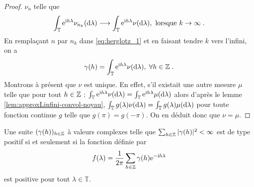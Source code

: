 \begin{proof}
$\nu_n$ telle que
$$
\int_{\mathbb{T}}\mathrm{e}^{\mathrm{i} h\lambda}\nu_{n_k}(\mathrm{d}\lambda)
\longrightarrow \int_{\mathbb{T}}\mathrm{e}^{\mathrm{i} h\lambda}\nu(\mathrm{d}\lambda),
\textrm{ lorsque }k\to\infty\;.
$$
En rempla\c{c}ant $n$ par $n_k$ dans \eqref{eq:herglotz_1} et en faisant
tendre $k$ vers l'infini, on a
$$
\gamma(h)=\int_{\mathbb{T}}\mathrm{e}^{\mathrm{i} h \lambda}\nu(\mathrm{d}\lambda),\; \forall h\in\mathbb{Z}\;.
$$
Montrons \`a pr\'esent que $\nu$ est unique. En effet, s'il existait une autre mesure
$\mu$ telle que pour tout $h\in\mathbb{Z}$ : $\int_{\mathbb{T}}\mathrm{e}^{\mathrm{i} h
  \lambda}\nu(\mathrm{d}\lambda)=\int_{\mathbb{T}}\mathrm{e}^{\mathrm{i} h
  \lambda}\mu(\mathrm{d}\lambda)$
alors d'apr\`es le lemme \ref{lem:approxLinfini-convol-noyau},
$\int_{\mathbb{T}}
g(\lambda)\nu(\mathrm{d}\lambda)=\int_{\mathbb{T}}g(\lambda)\mu(\mathrm{d}\lambda)$
pour toute fonction continue $g$ telle que $g(\pi)=g(-\pi)$.
On en d\'eduit donc que $\nu=\mu$.

\end{proof}

\begin{corollary}
\label{prop:testpositif}
 Une suite $(\gamma(h))_{h \in \mathbb{Z}}$ \`a valeurs complexes telle que
 $\sum_{h\in \mathbb{Z}} |\gamma(h)|^2<\infty$ est de type
positif si et seulement si la fonction d\'efinie par
$$
 f(\lambda)=\frac{1}{2\pi}\sum_{h\in\mathbb{Z}} \gamma(h)\mathrm{e}^{-\mathrm{i} h \lambda}
$$
est positive pour tout $\lambda \in \mathbb{T}$.
\end{corollary}

